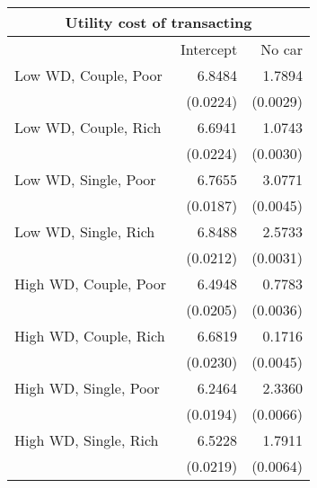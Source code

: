 \begin{tabular}{lrr} 
\toprule 
\multicolumn{3}{c}{Utility cost of transacting} \\ 
\midrule
                                &    Intercept   &       No car  \\ 
\midrule 
          Low WD, Couple, Poor  &       6.8484   &       1.7894  \\ 
                                & (0.0224)   & (0.0029)  \\ 
          Low WD, Couple, Rich  &       6.6941   &       1.0743  \\ 
                                & (0.0224)   & (0.0030)  \\ 
          Low WD, Single, Poor  &       6.7655   &       3.0771  \\ 
                                & (0.0187)   & (0.0045)  \\ 
          Low WD, Single, Rich  &       6.8488   &       2.5733  \\ 
                                & (0.0212)   & (0.0031)  \\ 
         High WD, Couple, Poor  &       6.4948   &       0.7783  \\ 
                                & (0.0205)   & (0.0036)  \\ 
         High WD, Couple, Rich  &       6.6819   &       0.1716  \\ 
                                & (0.0230)   & (0.0045)  \\ 
         High WD, Single, Poor  &       6.2464   &       2.3360  \\ 
                                & (0.0194)   & (0.0066)  \\ 
         High WD, Single, Rich  &       6.5228   &       1.7911  \\ 
                                & (0.0219)   & (0.0064)  \\ 
\bottomrule \end{tabular} 
